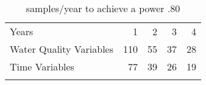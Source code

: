 \begin{table}[htbp]
\caption{samples/year to achieve a power .80}
\begin{center}
\begin{tabular}{lrrrr}
\hline\noalign{\smallskip}
Years & 1 & 2 & 3 & 4 \\ \cline{2-5}\noalign{\smallskip}
Water Quality Variables & 110 & 55 & 37 & 28 \\ 
Time Variables & 77 & 39  & 26  & 19  \\ \hline\noalign{\smallskip}
\end{tabular}
\end{center}
\label{tab:sytaapeighty}
\end{table}